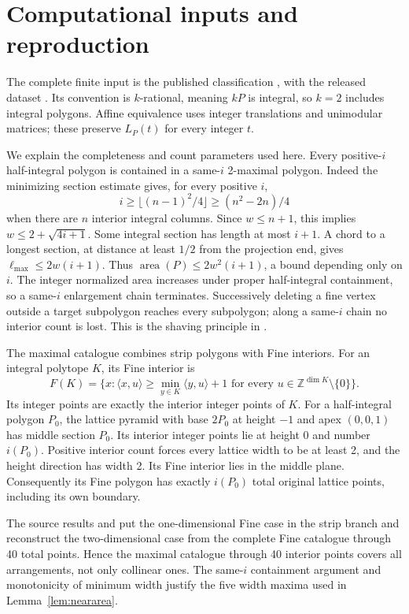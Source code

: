 \documentclass[11pt]{article}
\newcommand{\Z}{\mathbb Z}
\newcommand{\area}{\operatorname{area}}
\begin{document}
\section{Computational inputs and reproduction}\label{sec:computation}
The complete finite input is the published classification
\cite[Classification 6.7 and the following enumeration]{Classification},
with the released dataset \cite{Dataset}. Its convention is \(k\)-rational,
meaning \(kP\) is integral, so \(k=2\) includes integral polygons.
Affine equivalence uses integer translations and unimodular matrices; these
preserve \(L_P(t)\) for every integer \(t\).

We explain the completeness and count parameters used here.
Every positive-\(i\) half-integral polygon is contained in a same-\(i\)
2-maximal polygon. Indeed the minimizing section estimate gives, for every positive \(i\),
\[
 i\ge\lfloor(n-1)^2/4\rfloor\ge(n^2-2n)/4
\]
when there are \(n\) interior integral columns. Since \(w\le n+1\), this
implies \(w\le2+\sqrt{4i+1}\). Some integral section has length at most
\(i+1\). A chord to a longest section, at distance at least \(1/2\) from
the projection end, gives \(\ell_{\max}\le2w(i+1)\).
Thus \(\area(P)\le2w^2(i+1)\), a bound depending only on \(i\).
The integer normalized area increases under proper half-integral containment,
so a same-\(i\) enlargement chain terminates.
Successively deleting a fine vertex outside a target subpolygon reaches
every subpolygon; along a same-\(i\) chain no interior count is lost.
This is the shaving principle in \cite[Proposition 2.9, Algorithm 1 and
Remark 2.14]{Classification}.

The maximal catalogue combines strip polygons with Fine interiors.
For an integral polytope \(K\), its Fine interior is
\[
 F(K)=\{x:\langle x,u\rangle\ge\min_{y\in K}\langle y,u\rangle+1
               \text{ for every }u\in\Z^{\dim K}\setminus\{0\}\}.
\]
Its integer points are exactly the interior integer points of \(K\).
For a half-integral polygon \(P_0\), the lattice pyramid with base
\(2P_0\) at height \(-1\) and apex \((0,0,1)\) has middle section \(P_0\).
Its interior integer points lie at height 0 and number \(i(P_0)\).
Positive interior count forces every lattice width to be at least 2, and the
height direction has width 2. Its Fine interior lies in the middle plane.
Consequently its Fine polygon has exactly \(i(P_0)\) total original lattice
points, including its own boundary.

The source results \cite[Propositions 6.4 and 6.5]{Classification} and
\cite[Theorems 2.5, 3.2 and 4.1; Remark 3.16]{Fine} put the
one-dimensional Fine case in the strip branch and reconstruct the
two-dimensional case from the complete Fine catalogue through 40 total points.
Hence the maximal catalogue through 40 interior points covers all arrangements,
not only collinear ones. The same-\(i\) containment argument and monotonicity
of minimum width justify the five width maxima used in
Lemma~\ref{lem:neararea}.
\end{document}
